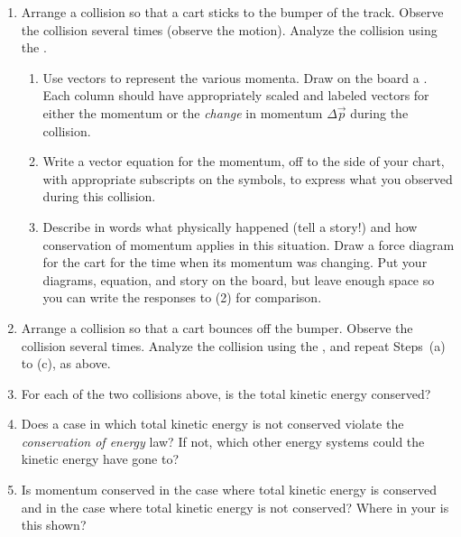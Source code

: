\begin{enumerate}
	\item Arrange a collision so that a cart sticks to the bumper of the track. Observe the collision several times (observe the motion). Analyze the collision using the \pConsModel{}.
	\begin{enumerate}
		\item Use vectors to represent the various momenta. Draw on the board a \pchart{}. Each column should have appropriately scaled and labeled vectors for either the momentum or the \emph{change} in momentum $\Delta \vec{p}$ during the collision.
		
		\item Write a vector equation for the momentum, off to the side of your chart, with appropriate subscripts on the symbols, to express what you observed during this collision.
		
		\item Describe in words what physically happened (tell a story!) and how conservation of momentum applies in this situation. Draw a force diagram for the cart for the time when its momentum was changing. Put your diagrams, equation, and story on the board, but leave enough space so you can write the responses to (2) for comparison.
	\end{enumerate}
	
	\item Arrange a collision so that a cart bounces off the bumper. Observe the collision several times. Analyze the collision using the \pConsModel{}, and repeat Steps~(a) to (c), as above.
	
	
	\item For each of the two collisions above, is the total kinetic energy conserved?
		
	\item Does a case in which total kinetic energy is not conserved violate the \emph{conservation of energy} law? If not, which other energy systems could the kinetic energy have gone to?
	
	\item Is momentum conserved in the case where total kinetic energy is conserved and in the case where total kinetic energy is not conserved? Where in your \pchart{} is this shown?
\end{enumerate}

